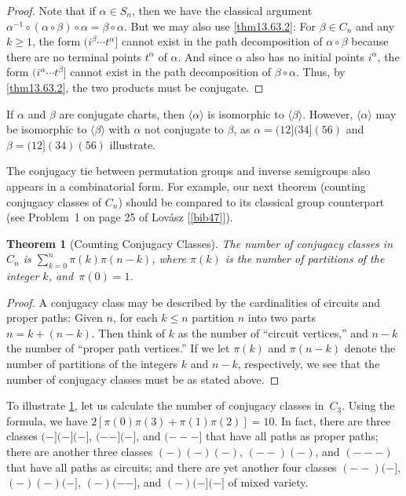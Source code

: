 \documentclass{surv-l}
\numberwithin{equation}{section}
\numberwithin{table}{section}
\numberwithin{figure}{section}
\theoremstyle{plain}
\newtheorem{theorem}[equation]{Theorem}
\theoremstyle{definition}
\begin{document}
\begin{proof} Note that if $\alpha\in S_{n}$, then we have the classical
argument $\alpha^{-1}\circ (\alpha \circ \beta)\circ\alpha=\beta
\circ\alpha$. But we may also use \ref{thm13.63.2}: For $\beta\in
C_{n}$ and any $k\geq 1$, the form $(i^{\beta}\cdots t^{\alpha}]$
cannot exist in the path decomposition of $\alpha \circ\beta$
because there are no terminal points $t^{\alpha}$ of $\alpha$. And
since $\alpha$ also has no initial points $i^{\alpha}$, the form
$(i^{\alpha}\cdots t^{\beta}]$ cannot exist in the path
decomposition of $\beta \circ\alpha$. Thus, by \ref{thm13.63.2},
the two products must be conjugate.
\end{proof}

If $\alpha$ and $\beta$ are conjugate charts, then
$\langle\alpha\rangle$ is isomorphic to $\langle\beta\rangle$.
However, $\langle\alpha\rangle$ may be isomorphic to
$\langle\beta\rangle$ with $\alpha$ not conjugate to $\beta$,
as $\alpha=(12](34](56)$ and $\beta=(12](34)(56)$ illustrate.

The conjugacy tie between permutation groups and inverse
semigroups also appears in a combinatorial form. For example,
our next theorem (counting conjugacy classes of $C_{n}$) should be
compared to its classical group counterpart (see Problem~1 on page
25 of Lov\'{a}sz
[\ref{bib47}]).

\begin{theorem}[Counting Conjugacy Classes]\label{thm13.63.5}
The number of conjugacy classes in $C_{n}$ is
$\sum_{k=0}^{n}\pi(k)\pi(n-k)$, where $\pi(k)$ is the number
of partitions of the integer $k$, and~$\pi(0)=1$.
\end{theorem}

\begin{proof}A conjugacy class may be described by the cardinalities of
circuits and proper paths: Given $n$, for each $k\leq n$
partition $n$ into two parts $n= k+(n-k)$. Then think of $k$
as the number of ``circuit vertices,'' and $n-k$ the number of
``proper path vertices.'' If we let $\pi(k)$ and $\pi(n-k)$
denote the number of partitions of the integers $k$ and $n-k$,
respectively, we see that the number of conjugacy classes must
be as stated above.
\end{proof}

To illustrate \ref{thm13.63.5}, let us calculate the number of
conjugacy classes in~$C_{3}$. Using the formula, we have
$2[\pi(0)\pi(3)+\pi(1)\pi(2)]=10$. In fact, there are three
classes $(-](-](-]$, $(--](-]$, and $(---]$ that have all paths
as proper paths; there are another three classes $(-)(-)(-)$,
$(--)(-)$, and $(---)$ that have all paths as circuits; and
there are yet another four classes $(--)(-]$, $(-)(-)(-]$, $(-)(--]$,
and $(-)(-](-]$ of mixed variety.
\end{document}
